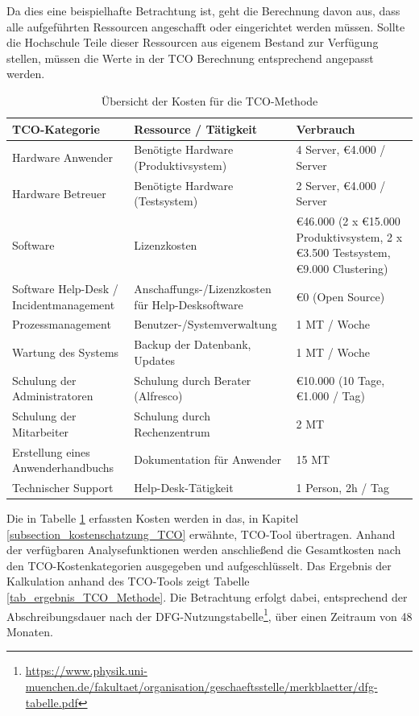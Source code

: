 Da dies eine beispielhafte Betrachtung ist, geht die Berechnung davon aus, dass alle aufgeführten Ressourcen angeschafft oder eingerichtet werden müssen. Sollte die Hochschule Teile dieser Ressourcen aus eigenem Bestand zur Verfügung stellen, müssen die Werte in der TCO Berechnung entsprechend angepasst werden.

\begin{table}[h!]
	\begin{tabularx}{\textwidth}{|X|X|X|}
		\hline \textbf{TCO-Kategorie} & \textbf{Ressource / Tätigkeit} & \textbf{Verbrauch}\\
		\hline Hardware Anwender & Benötigte Hardware (Produktivsystem) & 4 Server, \euro 4.000 / Server \\ 
		\hline Hardware Betreuer & Benötigte Hardware (Testsystem) & 2 Server, \euro 4.000 / Server\\
		\hline Software & Lizenzkosten & \euro 46.000
		(2 x \euro 15.000
		Produktivsystem,
		2 x \euro 3.500
		Testsystem,
		\euro 9.000 Clustering)\\
		\hline Software Help-Desk / Incidentmanagement & Anschaffungs-/Lizenzkosten
		für Help-Desksoftware
		 & \euro 0 (Open Source) \\
		\hline Prozessmanagement & Benutzer-/Systemverwaltung & 1 MT / Woche\\
		\hline Wartung des Systems & Backup der Datenbank, Updates
		 & 1 MT / Woche \\
		\hline Schulung der Administratoren & Schulung durch Berater
		(Alfresco) & \euro 10.000 (10 Tage, \euro 1.000 / Tag) \\
		\hline Schulung der Mitarbeiter & Schulung durch Rechenzentrum & 2 MT\\
		\hline Erstellung eines Anwenderhandbuchs & Dokumentation für Anwender & 15 MT\\
		\hline Technischer Support & Help-Desk-Tätigkeit & 1 Person, 2h / Tag\\		
		\hline
	\end{tabularx}
	\caption{Übersicht der Kosten für die TCO-Methode}
	\label{tab_ubersicht_kosten_TCO}
\end{table}

Die in Tabelle \ref{tab_ubersicht_kosten_TCO} erfassten Kosten werden in das, in Kapitel \ref{subsection_kostenschatzung_TCO} erwähnte, TCO-Tool übertragen. Anhand der verfügbaren Analysefunktionen werden anschließend die Gesamtkosten nach den TCO-Kostenkategorien ausgegeben und aufgeschlüsselt. Das Ergebnis der Kalkulation anhand des TCO-Tools zeigt Tabelle \ref{tab_ergebnis_TCO_Methode}. Die Betrachtung erfolgt dabei, entsprechend der Abschreibungsdauer nach der DFG-Nutzungstabelle\footnote{\url{https://www.physik.uni-muenchen.de/fakultaet/organisation/geschaeftsstelle/merkblaetter/dfg-tabelle.pdf}}, über einen Zeitraum von 48 Monaten.

